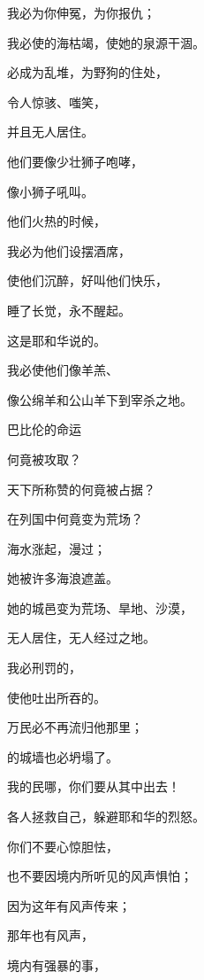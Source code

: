{\par }{\Q 我必为你伸冤，为你报仇；
\par }{\Q 我必使{}的海枯竭，使她的泉源干涸。
\par }{\Q {}必成为乱堆，为野狗的住处，
\par }{\Q 令人惊骇、嗤笑，
\par }{\Q 并且无人居住。
\par }{\Q {}他们要像少壮狮子咆哮，
\par }{\Q 像小狮子吼叫。
\par }{\Q {}他们火热的时候，
\par }{\Q 我必为他们设摆酒席，
\par }{\Q 使他们沉醉，好叫他们快乐，
\par }{\Q 睡了长觉，永不醒起。
\par }{\Q 这是耶和华说的。
\par }{\Q {}我必使他们像羊羔、
\par }{\Q 像公绵羊和公山羊下到宰杀之地。
\par }{\SH 巴比伦的命运
\par }{\Q {}何竟被攻取？
\par }{\Q 天下所称赞的何竟被占据？
\par }{在列国中何竟变为荒场？
\par }{\Q {}海水涨起，漫过{}；
\par }{\Q 她被许多海浪遮盖。
\par }{\Q {}她的城邑变为荒场、旱地、沙漠，
\par }{\Q 无人居住，无人经过之地。
\par }{\Q {}我必刑罚{}的{}，
\par }{\Q 使他吐出所吞的。
\par }{\Q 万民必不再流归他那里；
\par }{的城墙也必坍塌了。
\par }{\BB \par }{\Q {}我的民哪，你们要从其中出去！
\par }{\Q 各人拯救自己，躲避耶和华的烈怒。
\par }{\Q {}你们不要心惊胆怯，
\par }{\Q 也不要因境内所听见的风声惧怕；
\par }{\Q 因为这年有风声传来；
\par }{\Q 那年也有风声{}，
\par }{\Q 境内有强暴的事，
}
